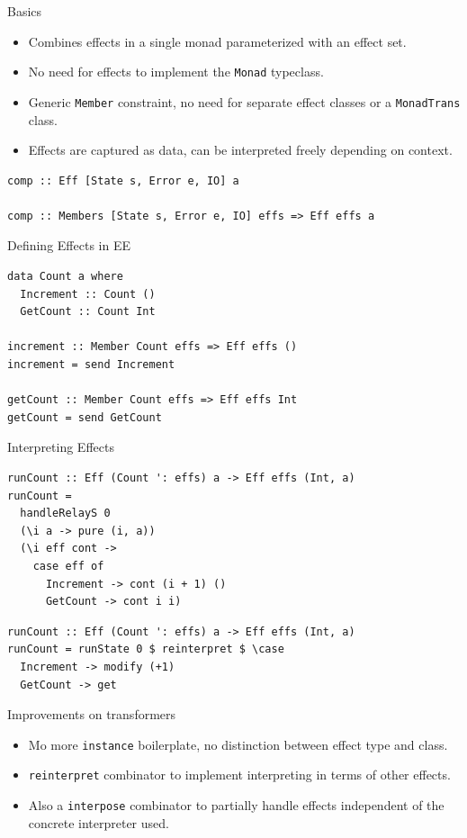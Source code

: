 \documentclass[aspectratio=169]{beamer}
\begin{document}
\begin{frame}[fragile]{Basics}
  \begin{itemize}
  \item Combines effects in a single monad parameterized with an effect set.
  \item No need for effects to implement the \texttt{Monad} typeclass.
  \item Generic \texttt{Member} constraint, no need for separate effect classes
    or a \texttt{MonadTrans} class.
  \item Effects are captured as data, can be interpreted freely depending on context.
  \end{itemize}
  \pause
  \begin{lstlisting}
comp :: Eff [State s, Error e, IO] a

comp :: Members [State s, Error e, IO] effs => Eff effs a
  \end{lstlisting}
\end{frame}

\begin{frame}[fragile]{Defining Effects in EE}
  \begin{lstlisting}
data Count a where
  Increment :: Count ()
  GetCount :: Count Int

increment :: Member Count effs => Eff effs ()
increment = send Increment

getCount :: Member Count effs => Eff effs Int
getCount = send GetCount
  \end{lstlisting}
\end{frame}

\begin{frame}[fragile]{Interpreting Effects}
  \begin{lstlisting}
runCount :: Eff (Count ': effs) a -> Eff effs (Int, a)
runCount =
  handleRelayS 0
  (\i a -> pure (i, a))
  (\i eff cont ->
    case eff of
      Increment -> cont (i + 1) ()
      GetCount -> cont i i)
  \end{lstlisting}
  \pause
  \begin{lstlisting}
runCount :: Eff (Count ': effs) a -> Eff effs (Int, a)
runCount = runState 0 $ reinterpret $ \case
  Increment -> modify (+1)
  GetCount -> get
  \end{lstlisting}
\end{frame}

\begin{frame}{Improvements on transformers}
  \begin{itemize}
  \item Mo more \texttt{instance} boilerplate, no distinction between effect
    type and class.
  \item \texttt{reinterpret} combinator to implement interpreting in terms of
    other effects.
  \item Also a \texttt{interpose} combinator to partially handle effects
    independent of the concrete interpreter used.
  \end{itemize}
\end{frame}
\end{document}
